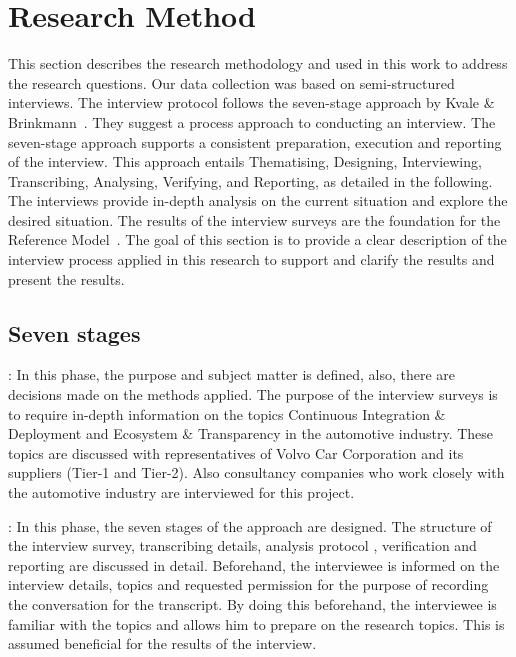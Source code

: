 \section{Research Method}\label{sec:researchMethod}

This section describes the research methodology and used in this work to address the research questions.
Our data collection was based on semi-structured interviews. 
The interview protocol follows the  seven-stage approach by Kvale \& Brinkmann~\cite{Kvale2015Interviews}. 
They suggest a process approach to conducting an interview. The seven-stage approach supports a consistent preparation, execution and reporting of the interview. This approach entails Thematising, Designing, Interviewing, Transcribing, Analysing, Verifying, and Reporting, as detailed in the following. The interviews provide in-depth analysis on the current situation and explore the desired situation. The results of the interview surveys are the foundation for the Reference Model~\cite{Blessing:2009:DDR:1717807}. The goal of this section is to provide a clear description of the interview process applied in this research to support and clarify the results and present the results.

\subsection{Seven stages}

: In this phase, the purpose and subject matter is defined, also, there are decisions made on the methods applied. The purpose of the interview surveys is to require in-depth information on the topics Continuous Integration \& Deployment and Ecosystem \& Transparency in the automotive industry. These topics are discussed with representatives of Volvo Car Corporation and its suppliers (Tier-1 and Tier-2). Also consultancy companies who work closely with the automotive industry are interviewed for this project.

: In this phase, the seven stages of the approach are designed. The structure of the interview survey, transcribing details, analysis protocol \cite{saldana2015coding}, verification and reporting are discussed in detail. Beforehand, the interviewee is informed on the interview details, topics and requested permission for the purpose of recording the conversation for the transcript. By doing this beforehand, the interviewee is familiar with the topics and allows him to prepare on the research topics. This is assumed beneficial for the results of the interview.

